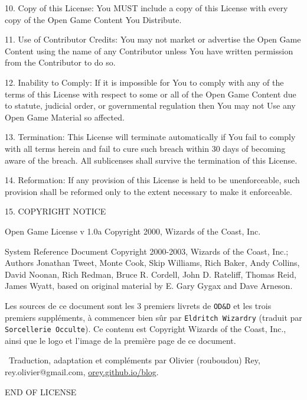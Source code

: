 \documentclass[11pt]{article}
\begin{document}
\bigskip

10. Copy of this License: You MUST include a copy of this License with every copy of the Open Game Content You Distribute.

\bigskip

11. Use of Contributor Credits: You may not market or advertise the Open Game Content using the name of any Contributor unless You have written permission from the Contributor to do so.

\bigskip

12. Inability to Comply: If it is impossible for You to comply with any of the terms of this License with respect to some or all of the Open Game Content due to statute, judicial order, or governmental regulation then You may not Use any Open Game Material so affected.

\bigskip

13. Termination: This License will terminate automatically if You fail to comply with all terms herein and fail to cure such breach within 30 days of becoming aware of the breach. All sublicenses shall survive the termination of this License.

\bigskip

14. Reformation: If any provision of this License is held to be unenforceable, such provision shall be reformed only to the extent necessary to make it enforceable.

\bigskip

15. COPYRIGHT NOTICE

\bigskip

Open Game License v 1.0a Copyright 2000, Wizards of the Coast, Inc.

\bigskip

System Reference Document Copyright 2000-2003, Wizards of the Coast, Inc.; Authors Jonathan Tweet, Monte Cook, Skip Williams, Rich Baker, Andy Collins, David Noonan, Rich Redman, Bruce R. Cordell, John D. Rateliff, Thomas Reid, James Wyatt, based on original material by E. Gary Gygax and Dave Arneson.

\bigskip

Les sources de ce document sont les 3 premiers livrets de \texttt{OD\&D} et les trois premiers suppléments, à commencer bien sûr par \texttt{Eldritch Wizardry} (traduit par \texttt{Sorcellerie Occulte}). Ce contenu est Copyright Wizards of the Coast, Inc., ainsi que le logo et l'image de la première page de ce document.

\bigskip

\textcopyright\ Traduction, adaptation et compléments par Olivier (rouboudou) Rey, rey.olivier@gmail.com, \linebreak \href{https://orey.github.io/blog}{orey.github.io/blog}.

\bigskip

END OF LICENSE
\end{document}
